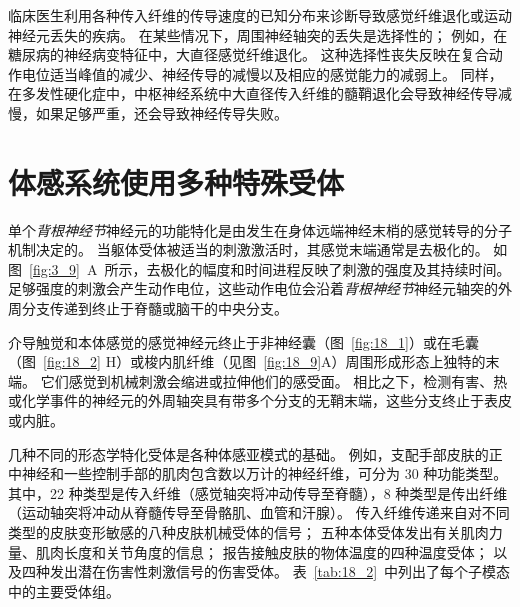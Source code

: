 临床医生利用各种传入纤维的传导速度的已知分布来诊断导致感觉纤维退化或运动神经元丢失的疾病。
在某些情况下，周围神经轴突的丢失是选择性的；
例如，在糖尿病的神经病变特征中，大直径感觉纤维退化。
这种选择性丧失反映在复合动作电位适当峰值的减少、神经传导的减慢以及相应的感觉能力的减弱上。
同样，在多发性硬化症中，中枢神经系统中大直径传入纤维的髓鞘退化会导致神经传导减慢，如果足够严重，还会导致神经传导失败。


\section{体感系统使用多种特殊受体}

单个\textit{背根神经节}神经元的功能特化是由发生在身体远端神经末梢的感觉转导的分子机制决定的。
当躯体受体被适当的刺激激活时，其感觉末端通常是去极化的。
如图~\ref{fig:3_9}~A~所示，去极化的幅度和时间进程反映了刺激的强度及其持续时间。
足够强度的刺激会产生动作电位，这些动作电位会沿着\textit{背根神经节}神经元轴突的外周分支传递到终止于脊髓或脑干的中央分支。


介导触觉和本体感觉的感觉神经元终止于非神经囊（图~\ref{fig:18_1}）或在毛囊（图~\ref{fig:18_2} H）或梭内肌纤维（见图~\ref{fig:18_9}A）周围形成形态上独特的末端。
它们感觉到机械刺激会缩进或拉伸他们的感受面。
相比之下，检测有害、热或化学事件的神经元的外周轴突具有带多个分支的无鞘末端，这些分支终止于表皮或内脏。


几种不同的形态学特化受体是各种体感亚模式的基础。
例如，支配手部皮肤的正中神经和一些控制手部的肌肉包含数以万计的神经纤维，可分为 30 种功能类型。
其中，22 种类型是传入纤维（感觉轴突将冲动传导至脊髓），8 种类型是传出纤维（运动轴突将冲动从脊髓传导至骨骼肌、血管和汗腺）。
传入纤维传递来自对不同类型的皮肤变形敏感的八种皮肤机械受体的信号；
五种本体受体发出有关肌肉力量、肌肉长度和关节角度的信息；
报告接触皮肤的物体温度的四种温度受体；
以及四种发出潜在伤害性刺激信号的伤害受体。
表~\ref{tab:18_2}~中列出了每个子模态中的主要受体组。


